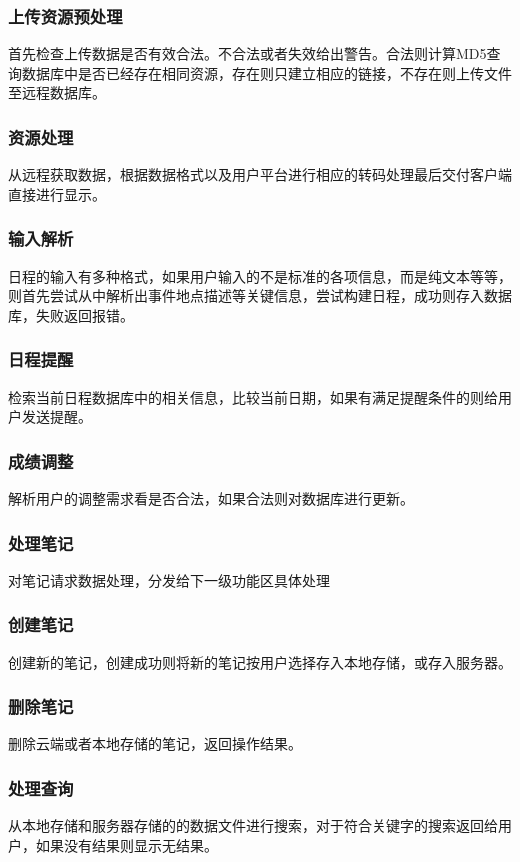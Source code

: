 \subsubsection{上传资源预处理}
首先检查上传数据是否有效合法。不合法或者失效给出警告。合法则计算MD5查询数据库中是否已经存在相同资源，存在则只建立相应的链接，不存在则上传文件至远程数据库。
\subsubsection{资源处理}
从远程获取数据，根据数据格式以及用户平台进行相应的转码处理最后交付客户端直接进行显示。
\subsubsection{输入解析}
日程的输入有多种格式，如果用户输入的不是标准的各项信息，而是纯文本等等，则首先尝试从中解析出事件地点描述等关键信息，尝试构建日程，成功则存入数据库，失败返回报错。
\subsubsection{日程提醒}
检索当前日程数据库中的相关信息，比较当前日期，如果有满足提醒条件的则给用户发送提醒。

\subsubsection{成绩调整}
解析用户的调整需求看是否合法，如果合法则对数据库进行更新。

\subsubsection{处理笔记}
对笔记请求数据处理，分发给下一级功能区具体处理

\subsubsection{创建笔记}
创建新的笔记，创建成功则将新的笔记按用户选择存入本地存储，或存入服务器。

\subsubsection{删除笔记}
删除云端或者本地存储的笔记，返回操作结果。

\subsubsection{处理查询}
从本地存储和服务器存储的的数据文件进行搜索，对于符合关键字的搜索返回给用户，如果没有结果则显示无结果。




